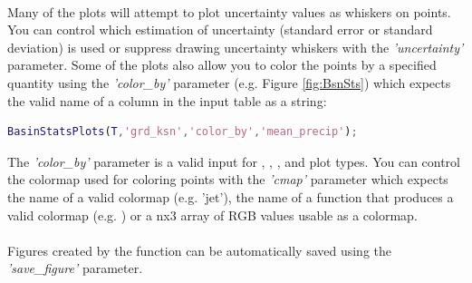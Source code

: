 \paragraph{}Many of the plots will attempt to plot uncertainty values as whiskers on points. You can control which estimation of uncertainty (standard error or standard deviation) is used or suppress drawing uncertainty whiskers with the \textit{'uncertainty'} parameter.  Some of the plots also allow you to color the points by a specified quantity using the \textit{'color\_by'} parameter (e.g. Figure \ref{fig:BsnSts}) which expects the valid name of a column in the input table as a string:

\begin{lstlisting}[language=Matlab]
% To color a plot of mean gradient vs mean ksn by mean precipitation, and assuming the mean precipitation is stored in a column named 'mean_precip' in the input table, T
BasinStatsPlots(T,'grd_ksn','color_by','mean_precip');
\end{lstlisting}

\noindent
The \textit{'color\_by'} parameter is a valid input for , , , and  plot types. You can control the colormap used for coloring points with the \textit{'cmap'} parameter which expects the name of a valid colormap (e.g. 'jet'), the name of a function that produces a valid colormap (e.g. ) or a nx3 array of RGB values usable as a colormap.

\paragraph{}Figures created by the function can be automatically saved using the \textit{'save\_figure'} parameter. 

